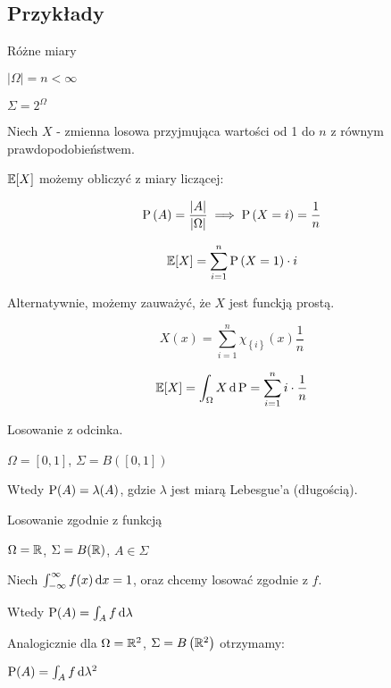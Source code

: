 \subsection{Przykłady}

\begin{example} 
    Różne miary

    \( \left| \Omega \right| = n < \infty \)

    \( \Sigma = 2^{\Omega} \)

    Niech \( X \) - zmienna losowa przyjmująca wartości od 1 do \( n \) z równym prawdopodobieństwem.

    \( \expected{X} \) możemy obliczyć z miary liczącej:

    \[ 
        \operatorname{P} \left( A \right) = \frac{ \left| A \right| }{ \left| \Omega \right| } \implies \operatorname{P} \left( X = i \right) = \frac{1}{n} 
    \]

    \[ 
        \expected{X} = \sum_{i = 1}^{n} \prob \left( X = 1 \right) \cdot i 
    \]

    Alternatywnie, możemy zauważyć, że \( X \) jest funckją prostą.

    \[ 
        X \left( x \right) = \sum_{i = 1}^{n} \chi_{\left\{ i \right\}}\left( x \right) \frac{1}{n} 
    \]

    \[ 
        \expected{X} = \int_{\Omega} X \diff \prob = \sum_{i=1}^{n} i \cdot \frac{1}{n} 
    \]

\end{example}

\begin{example}
    Losowanie z odcinka.

    \( \Omega = [ 0, 1] \), \( \Sigma = B\left([0, 1] \right) \)

    Wtedy \( \operatorname{P}(A) = \lambda(A) \), gdzie \( \lambda \) jest miarą Lebesgue'a (długością).
    
\end{example}

\begin{example}
    Losowanie zgodnie z funkcją

    \( \Omega = \mathbb{R} \), \( \Sigma = B(\mathbb{R}) \), \( A \in \Sigma \)

    Niech \( \int_{-\infty}^{\infty} f(x) \mathop{}\!\mathrm{d} x = 1 \), oraz chcemy losować zgodnie z \( f \).

    Wtedy \( \operatorname{P}(A) = \int_A f \mathop{}\!\mathrm{d} \lambda \) 

    Analogicznie dla \( \Omega = \mathbb{R}^2 \), \( \Sigma = B\left( \mathbb{R}^2 \right) \) otrzymamy:

    \( \operatorname{P}(A) = \int_A f \mathop{}\!\mathrm{d} \lambda^2 \)

\end{example}

